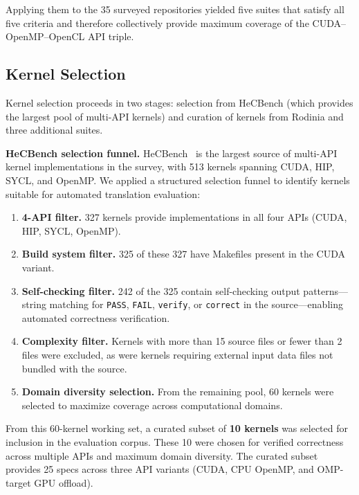 Applying them to the 35 surveyed repositories yielded five suites that satisfy all five criteria and therefore collectively provide maximum coverage of the CUDA--OpenMP--OpenCL API triple.

\subsection{Kernel Selection}
\label{sec:kernel-selection}

Kernel selection proceeds in two stages: selection from HeCBench (which provides the largest pool of multi-API kernels) and curation of kernels from Rodinia and three additional suites.

\textbf{HeCBench selection funnel.} HeCBench~\cite{HeCBench2023} is the largest source of multi-API kernel implementations in the survey, with 513 kernels spanning CUDA, HIP, SYCL, and OpenMP. We applied a structured selection funnel to identify kernels suitable for automated translation evaluation:

\begin{enumerate}
\item \textbf{4-API filter.} 327 kernels provide implementations in all four APIs (CUDA, HIP, SYCL, OpenMP).
\item \textbf{Build system filter.} 325 of these 327 have Makefiles present in the CUDA variant.
\item \textbf{Self-checking filter.} 242 of the 325 contain self-checking output patterns---string matching for \texttt{PASS}, \texttt{FAIL}, \texttt{verify}, or \texttt{correct} in the source---enabling automated correctness verification.
\item \textbf{Complexity filter.} Kernels with more than 15 source files or fewer than 2 files were excluded, as were kernels requiring external input data files not bundled with the source.
\item \textbf{Domain diversity selection.} From the remaining pool, 60 kernels were selected to maximize coverage across computational domains.
\end{enumerate}

From this 60-kernel working set, a curated subset of \textbf{10 kernels} was selected for inclusion in the evaluation corpus. These 10 were chosen for verified correctness across multiple APIs and maximum domain diversity. The curated subset provides 25 specs across three API variants (CUDA, CPU OpenMP, and OMP-target GPU offload).

